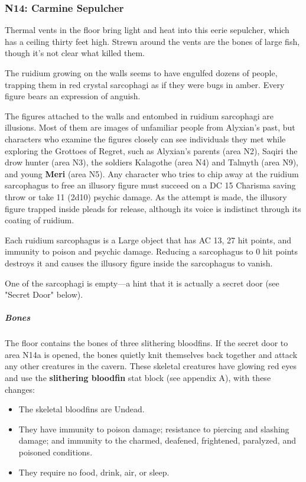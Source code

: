 \documentclass[10pt,a4paper,twoside,fancy,bg=print,twocolumn,openany,nodeprecatedcode]{dndbook}
\begin{document}
\subsubsection{N14: Carmine Sepulcher}
\begin{DndReadAloud}{}
Thermal vents in the floor bring light and heat into this eerie sepulcher, which has a ceiling thirty feet high. Strewn around the vents are the bones of large fish, though it's not clear what killed them.

The ruidium growing on the walls seems to have engulfed dozens of people, trapping them in red crystal sarcophagi as if they were bugs in amber. Every figure bears an expression of anguish.

\end{DndReadAloud}

The figures attached to the walls and entombed in ruidium sarcophagi are illusions. Most of them are images of unfamiliar people from Alyxian's past, but characters who examine the figures closely can see individuals they met while exploring the Grottoes of Regret, such as Alyxian's parents (area N2), Saqiri the drow hunter (area N3), the soldiers Kalagothe (area N4) and Talmyth (area N9), and young \textbf{Meri} (area N5). Any character who tries to chip away at the ruidium sarcophagus to free an illusory figure must succeed on a DC 15 Charisma saving throw or take 11 (2d10) psychic damage. As the attempt is made, the illusory figure trapped inside pleads for release, although its voice is indistinct through its coating of ruidium.

Each ruidium sarcophagus is a Large object that has AC 13, 27 hit points, and immunity to poison and psychic damage. Reducing a sarcophagus to 0 hit points destroys it and causes the illusory figure inside the sarcophagus to vanish.

One of the sarcophagi is empty—a hint that it is actually a secret door (see "Secret Door" below).

\subparagraph{Bones}
The floor contains the bones of three slithering bloodfins. If the secret door to area N14a is opened, the bones quietly knit themselves back together and attack any other creatures in the cavern. These skeletal creatures have glowing red eyes and use the \textbf{slithering bloodfin} stat block (see appendix A), with these changes:


\begin{itemize}
\item The skeletal bloodfins are Undead.
\item They have immunity to poison damage; resistance to piercing and slashing damage; and immunity to the charmed, deafened, frightened, paralyzed, and poisoned conditions.
\item They require no food, drink, air, or sleep.
\end{itemize}
\end{document}
